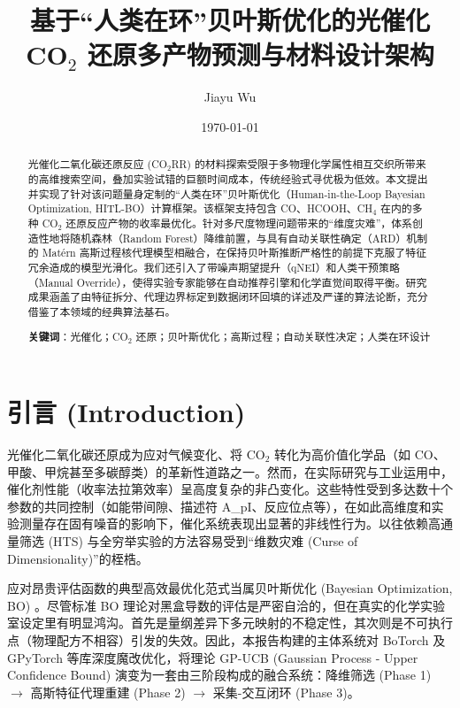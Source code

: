 \documentclass[12pt,a4paper]{article}
\title{\textbf{基于“人类在环”贝叶斯优化的光催化 \\ CO$_2$ 还原多产物预测与材料设计架构}}
\author{Jiayu Wu}
\date{\today}
\begin{document}
\maketitle

\begin{abstract}
光催化二氧化碳还原反应 (CO$_2$RR) 的材料探索受限于多物理化学属性相互交织所带来的高维搜索空间，叠加实验试错的巨额时间成本，传统经验式寻优极为低效。本文提出并实现了针对该问题量身定制的“人类在环”贝叶斯优化（Human-in-the-Loop Bayesian Optimization, HITL-BO）计算框架。该框架支持包含 CO、HCOOH、CH$_4$ 在内的多种 CO$_2$ 还原反应产物的收率最优化。针对多尺度物理问题带来的“维度灾难”，体系创造性地将随机森林（Random Forest）降维前置，与具有自动关联性确定（ARD）机制的 Matérn 高斯过程核代理模型相融合，在保持贝叶斯推断严格性的前提下克服了特征冗余造成的模型光滑化。我们还引入了带噪声期望提升（qNEI）和人类干预策略（Manual Override），使得实验专家能够在自动推荐引擎和化学直觉间取得平衡。研究成果涵盖了由特征拆分、代理边界标定到数据闭环回填的详述及严谨的算法论断，充分借鉴了本领域的经典算法基石。

\textbf{关键词}：光催化；CO$_2$ 还原；贝叶斯优化；高斯过程；自动关联性决定；人类在环设计
\end{abstract}

\vspace{2em}
\tableofcontents
\newpage

\section{引言 (Introduction)}

光催化二氧化碳还原成为应对气候变化、将 CO$_2$ 转化为高价值化学品（如 CO、甲酸、甲烷甚至多碳醇类）的革新性道路之一\cite{nature2025, jacs2024}。然而，在实际研究与工业运用中，催化剂性能（收率法拉第效率）呈高度复杂的非凸变化。这些特性受到多达数十个参数的共同控制（如能带间隙、描述符 A\_pI、反应位点等），在如此高维度和实验测量存在固有噪音的影响下，催化系统表现出显著的非线性行为。以往依赖高通量筛选 (HTS)\cite{nature2025} 与全穷举实验的方法容易受到“维数灾难 (Curse of Dimensionality)”的桎梏。

应对昂贵评估函数的典型高效最优化范式当属贝叶斯优化 (Bayesian Optimization, BO) \cite{bo2012}。尽管标准 BO 理论对黑盒导数的评估是严密自洽的，但在真实的化学实验室设定里有明显鸿沟。首先是量纲差异下多元映射的不稳定性\cite{turbo2019}，其次则是不可执行点（物理配方不相容）引发的失效。因此，本报告构建的主体系统对 BoTorch 及 GPyTorch 等库深度魔改优化，将理论 GP-UCB (Gaussian Process - Upper Confidence Bound)\cite{gpucb2026} 演变为一套由三阶段构成的融合系统：降维筛选 (Phase 1) $\rightarrow$ 高斯特征代理重建 (Phase 2) $\rightarrow$ 采集-交互闭环 (Phase 3)。
\end{document}
